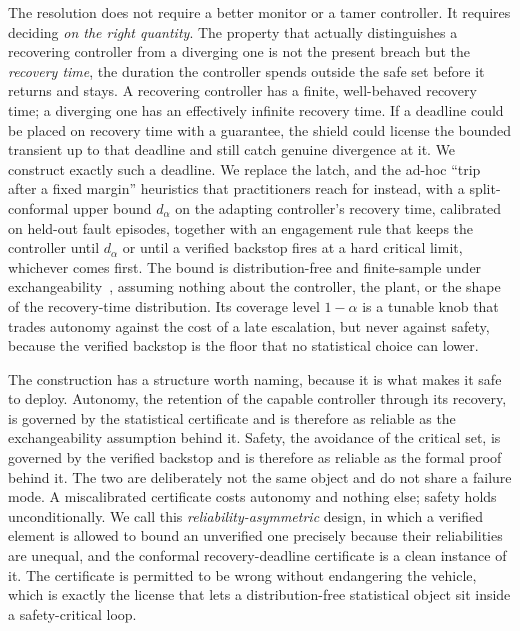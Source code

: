 \documentclass[11pt]{article}
\theoremstyle{plain}
\theoremstyle{definition}
\newcommand{\dalpha}{d_{\alpha}}
\begin{document}
The resolution does not require a better monitor or a tamer controller. It requires deciding
\emph{on the right quantity}. The property that actually distinguishes a recovering
controller from a diverging one is not the present breach but the \emph{recovery time}, the
duration the controller spends outside the safe set before it returns and stays. A recovering
controller has a finite, well-behaved recovery time; a diverging one has an effectively
infinite recovery time. If a deadline could be placed on recovery time with a guarantee, the
shield could license the bounded transient up to that deadline and still catch genuine
divergence at it. We construct exactly such a deadline. We replace the latch, and the ad-hoc
``trip after a fixed margin'' heuristics that practitioners reach for instead, with a
split-conformal upper bound $\dalpha$ on the adapting controller's recovery time, calibrated
on held-out fault episodes, together with an engagement rule that keeps the controller until
$\dalpha$ or until a verified backstop fires at a hard critical limit, whichever comes first.
The bound is distribution-free and finite-sample under exchangeability~\cite{Vovk2005,Lei2018,Angelopoulos2023},
assuming nothing about the controller, the plant, or the shape of the recovery-time
distribution. Its coverage level $1-\alpha$ is a tunable knob that trades autonomy against
the cost of a late escalation, but never against safety, because the verified backstop is the
floor that no statistical choice can lower.

The construction has a structure worth naming, because it is what makes it safe to deploy.
Autonomy, the retention of the capable controller through its recovery, is governed by the
statistical certificate and is therefore as reliable as the exchangeability assumption
behind it. Safety, the avoidance of the critical set, is governed by the verified backstop
and is therefore as reliable as the formal proof behind it. The two are deliberately not the
same object and do not share a failure mode. A miscalibrated certificate costs autonomy and
nothing else; safety holds unconditionally. We call this \emph{reliability-asymmetric}
design, in which a verified element is allowed to bound an unverified one precisely because
their reliabilities are unequal, and the conformal recovery-deadline certificate is a clean
instance of it. The certificate is permitted to be wrong without endangering the vehicle,
which is exactly the license that lets a distribution-free statistical object sit inside a
safety-critical loop.
\end{document}
